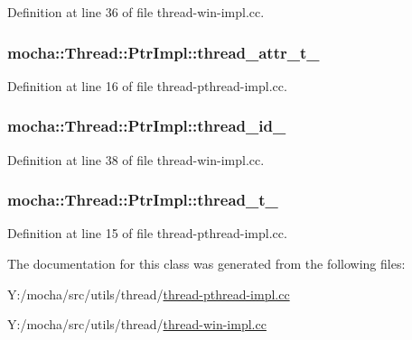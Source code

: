 Definition at line 36 of file thread-\/win-\/impl.cc.

\hypertarget{classmocha_1_1_thread_1_1_ptr_impl_a29a4de4bf4a3e973ca1dc3cfae2fe4b4}{
\subsubsection[{thread\_\-attr\_\-t\_\-}]{ {\bf mocha::Thread::PtrImpl::thread\_\-attr\_\-t\_\-}}}
\label{classmocha_1_1_thread_1_1_ptr_impl_a29a4de4bf4a3e973ca1dc3cfae2fe4b4}


Definition at line 16 of file thread-\/pthread-\/impl.cc.

\hypertarget{classmocha_1_1_thread_1_1_ptr_impl_a27bf45abeca59abe27ad15be2d12013d}{
\subsubsection[{thread\_\-id\_\-}]{ {\bf mocha::Thread::PtrImpl::thread\_\-id\_\-}}}
\label{classmocha_1_1_thread_1_1_ptr_impl_a27bf45abeca59abe27ad15be2d12013d}


Definition at line 38 of file thread-\/win-\/impl.cc.

\hypertarget{classmocha_1_1_thread_1_1_ptr_impl_afe4d13dd159cba55254c67277f3e0df9}{
\subsubsection[{thread\_\-t\_\-}]{ {\bf mocha::Thread::PtrImpl::thread\_\-t\_\-}}}
\label{classmocha_1_1_thread_1_1_ptr_impl_afe4d13dd159cba55254c67277f3e0df9}


Definition at line 15 of file thread-\/pthread-\/impl.cc.



The documentation for this class was generated from the following files:\begin{DoxyCompactItemize}
\item 
Y:/mocha/src/utils/thread/\hyperlink{thread-pthread-impl_8cc}{thread-\/pthread-\/impl.cc}\item 
Y:/mocha/src/utils/thread/\hyperlink{thread-win-impl_8cc}{thread-\/win-\/impl.cc}\end{DoxyCompactItemize}
